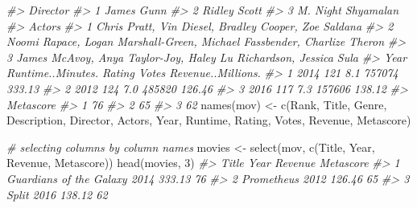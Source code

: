 \documentclass[
]{book}
\newenvironment{Shaded}{\begin{snugshade}}{\end{snugshade}}
\newcommand{\CommentTok}[1]{\textcolor[rgb]{0.56,0.35,0.01}{\textit{#1}}}
\newcommand{\DecValTok}[1]{\textcolor[rgb]{0.00,0.00,0.81}{#1}}
\newcommand{\FunctionTok}[1]{\textcolor[rgb]{0.00,0.00,0.00}{#1}}
\newcommand{\NormalTok}[1]{#1}
\newcommand{\OtherTok}[1]{\textcolor[rgb]{0.56,0.35,0.01}{#1}}
\newcommand{\StringTok}[1]{\textcolor[rgb]{0.31,0.60,0.02}{#1}}
\begin{document}
\begin{Shaded}
\begin{Highlighting}[]
\CommentTok{\#\textgreater{}             Director}
\CommentTok{\#\textgreater{} 1         James Gunn}
\CommentTok{\#\textgreater{} 2       Ridley Scott}
\CommentTok{\#\textgreater{} 3 M. Night Shyamalan}
\CommentTok{\#\textgreater{}                                                                    Actors}
\CommentTok{\#\textgreater{} 1                    Chris Pratt, Vin Diesel, Bradley Cooper, Zoe Saldana}
\CommentTok{\#\textgreater{} 2 Noomi Rapace, Logan Marshall{-}Green, Michael Fassbender, Charlize Theron}
\CommentTok{\#\textgreater{} 3        James McAvoy, Anya Taylor{-}Joy, Haley Lu Richardson, Jessica Sula}
\CommentTok{\#\textgreater{}   Year Runtime..Minutes. Rating  Votes Revenue..Millions.}
\CommentTok{\#\textgreater{} 1 2014               121    8.1 757074             333.13}
\CommentTok{\#\textgreater{} 2 2012               124    7.0 485820             126.46}
\CommentTok{\#\textgreater{} 3 2016               117    7.3 157606             138.12}
\CommentTok{\#\textgreater{}   Metascore}
\CommentTok{\#\textgreater{} 1        76}
\CommentTok{\#\textgreater{} 2        65}
\CommentTok{\#\textgreater{} 3        62}
\FunctionTok{names}\NormalTok{(mov) }\OtherTok{\textless{}{-}} \FunctionTok{c}\NormalTok{(}\StringTok{\textquotesingle{}Rank\textquotesingle{}}\NormalTok{, }\StringTok{\textquotesingle{}Title\textquotesingle{}}\NormalTok{, }\StringTok{\textquotesingle{}Genre\textquotesingle{}}\NormalTok{, }\StringTok{\textquotesingle{}Description\textquotesingle{}}\NormalTok{, }\StringTok{\textquotesingle{}Director\textquotesingle{}}\NormalTok{, }\StringTok{\textquotesingle{}Actors\textquotesingle{}}\NormalTok{, }
                  \StringTok{\textquotesingle{}Year\textquotesingle{}}\NormalTok{, }\StringTok{\textquotesingle{}Runtime\textquotesingle{}}\NormalTok{, }\StringTok{\textquotesingle{}Rating\textquotesingle{}}\NormalTok{, }\StringTok{\textquotesingle{}Votes\textquotesingle{}}\NormalTok{, }\StringTok{\textquotesingle{}Revenue\textquotesingle{}}\NormalTok{, }\StringTok{\textquotesingle{}Metascore\textquotesingle{}}\NormalTok{)}


\CommentTok{\# selecting columns by column names}
\NormalTok{movies }\OtherTok{\textless{}{-}} \FunctionTok{select}\NormalTok{(mov, }\FunctionTok{c}\NormalTok{(}\StringTok{\textquotesingle{}Title\textquotesingle{}}\NormalTok{, }\StringTok{\textquotesingle{}Year\textquotesingle{}}\NormalTok{, }\StringTok{\textquotesingle{}Revenue\textquotesingle{}}\NormalTok{, }\StringTok{\textquotesingle{}Metascore\textquotesingle{}}\NormalTok{))}
\FunctionTok{head}\NormalTok{(movies, }\DecValTok{3}\NormalTok{)}
\CommentTok{\#\textgreater{}                     Title Year Revenue Metascore}
\CommentTok{\#\textgreater{} 1 Guardians of the Galaxy 2014  333.13        76}
\CommentTok{\#\textgreater{} 2              Prometheus 2012  126.46        65}
\CommentTok{\#\textgreater{} 3                   Split 2016  138.12        62}


\end{Highlighting}
\end{Shaded}
\end{document}
